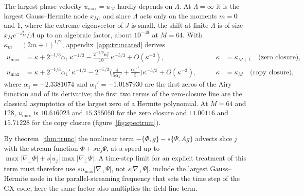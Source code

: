 The largest phase velocity $u_{\max}=u_M$ hardly depends on $\Lambda$. At $\Lambda=\infty$ it is the largest Gauss--Hermite node $x_M$, and since $\Lambda$ acts only on the moments $m=0$ and 1, where the extreme eigenvector of $J$ is small, the shift at finite $\Lambda$ is of size $x_Me^{-x_M^2}/\Lambda$ up to an algebraic factor, about $10^{-49}$ at $M=64$. With $\kappa_m=(2m+1)^{1/2}$, appendix~\ref{app:truncated} derives
\begin{equation}\label{eq:umax}
\begin{aligned}
  u_{\max}&=\kappa+2^{-1/3}\alpha_1\,\kappa^{-1/3}-\frac{2^{-2/3}\alpha_1^2}{10}\,\kappa^{-5/3}+O(\kappa^{-3}),&\qquad\kappa&=\kappa_{M+1}\quad\text{(zero closure)},\\
  u_{\max}&=\kappa+2^{-1/3}\alpha_1'\,\kappa^{-1/3}-2^{-5/3}\Big(\frac{4}{5\alpha_1'}+\frac{\alpha_1'^2}{5}\Big)\kappa^{-5/3}+O(\kappa^{-3}),&\qquad\kappa&=\kappa_M\quad\text{(copy closure)},
\end{aligned}
\end{equation}
where $\alpha_1=-2.3381074$ and $\alpha_1'=-1.0187930$ are the first zeros of the Airy function and of its derivative; the first two terms of the zero-closure line are the classical asymptotics of the largest zero of a Hermite polynomial. At $M=64$ and 128, $u_{\max}$ is $10.616023$ and $15.355050$ for the zero closure and $11.00116$ and $15.71228$ for the copy closure (figure~\ref{fig:spectrum}).

By theorem~\ref{thm:trunc} the nonlinear term $-\{\Phi,g\}-s\{\Psi,Ag\}$ advects slice $j$ with the stream function $\Phi+su_j\Psi$, at a speed up to $\max|\nabla_\perp\Phi|+s|u_j|\max|\nabla_\perp\Psi|$. A time-step limit for an explicit treatment of this term must therefore use $su_{\max}|\nabla_\perp\Psi|$, not $s|\nabla_\perp\Psi|$. \citet{Mandell2024} include the largest Gauss--Hermite node in the parallel-streaming frequency that sets the time step of the GX code; here the same factor also multiplies the field-line term.
